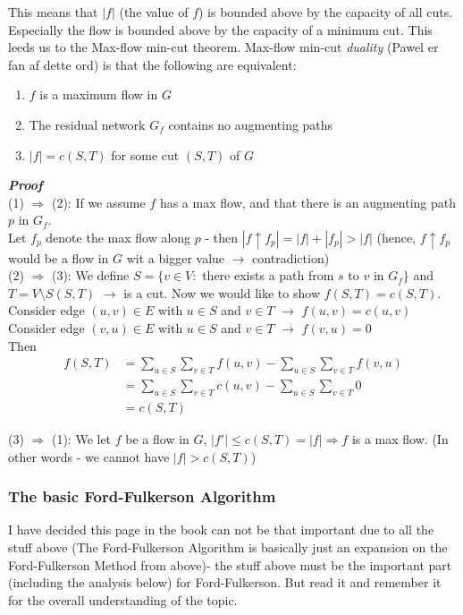This means that $|f|$ (the value of $f$) is bounded above by the capacity of all cuts. Especially the flow is bounded above by the capacity of a minimum cut. This leeds us to the Max-flow min-cut theorem. Max-flow min-cut \textit{duality} (Pawel er fan af dette ord) is that the following are equivalent:

\begin{enumerate}
	\item $f$ is a maximum flow in $G$
	\item The residual network $G_f$ contains no augmenting paths 
	\item $|f| = c(S, T)$ for some cut $(S, T)$ of $G$
\end{enumerate}

\textbf{\textit{Proof}}\\
(1) $\Rightarrow$ (2): If we assume $f$ has a max flow, and that there is an augmenting path $p$ in $G_f$. \\
Let $f_p$ denote the max flow along $p$ - then $|f \uparrow f_p| = |f| + |f_p| > |f|$ (hence, $f \uparrow f_p$ would be a flow in $G$ wit a bigger value $\rightarrow$ contradiction)\\

(2) $\Rightarrow$ (3): We define $S = \{v \in V :$ there exists a path from $s$ to $v$ in $G_f\}$ and $T = V\setminus S (S, T)$ $\rightarrow$ is a cut. Now we would like to show $f(S, T) = c(S, T)$. \\

Consider edge $(u, v) \in E$ with $u\in S$ and $v \in T$ $\rightarrow$ $f(u, v) = c(u, v)$\\
Consider edge $(v, u) \in E$ with $u\in S$ and $v \in T$ $\rightarrow$ $f(v, u) = 0$\\

Then \begin{align*}
f(S, T) &= \sum_{u \in S} \sum_{v \in T} f(u, v) - \sum_{u \in S} \sum_{v \in T} f(v, u)\\
&= \sum_{u \in S} \sum_{v \in T} c(u, v) - \sum_{u \in S} \sum_{v \in T} 0\\
&= c(S, T)
\end{align*}

(3) $\Rightarrow$ (1): We let $f$ be a flow in $G$, $|f'| \leq c(S, T) = |f| \Rightarrow f$ is a max flow. (In other words - we cannot have $|f| > c(S, T)$)
%
\subsubsection{The basic Ford-Fulkerson Algorithm}
I have decided this page in the book can not be that important due to all the stuff above (The Ford-Fulkerson Algorithm is basically just an expansion on the Ford-Fulkerson Method from above)- the stuff above must be the important part (including the analysis below) for Ford-Fulkerson. But read it and remember it for the overall understanding of the topic. 
%
